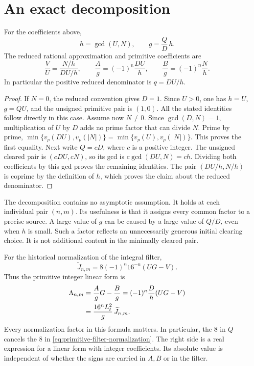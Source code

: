 \section{An exact decomposition}

\begin{proposition}
\label{prop:content-decomposition}
For the coefficients above,
\begin{equation}
 h=\gcd(U,N),\qquad
 g=\frac QD\,h.
 \label{eq:gcd-decomposition}
\end{equation}
The reduced rational approximation and primitive coefficients are
\begin{equation}
 \frac VU=\frac{N/h}{DU/h},\qquad
 \frac Ag=(-1)^n\frac{DU}{h},\qquad
 \frac Bg=(-1)^n\frac Nh.
 \label{eq:primitive-pair}
\end{equation}
In particular the positive reduced denominator is $q=DU/h$.
\end{proposition}

\begin{proof}
If $N=0$, the reduced convention gives $D=1$. Since $U>0$, one has $h=U$, $g=QU$, and the unsigned primitive pair is $(1,0)$. All the stated identities follow directly in this case. Assume now $N\ne0$. Since $\gcd(D,N)=1$, multiplication of $U$ by $D$ adds no prime factor that can divide $N$. Prime by prime, $\min\{v_p(DU),v_p(|N|)\}=\min\{v_p(U),v_p(|N|)\}$. This proves the first equality. Next write $Q=cD$, where $c$ is a positive integer. The unsigned cleared pair is $(cDU,cN)$, so its gcd is $c\gcd(DU,N)=ch$. Dividing both coefficients by this gcd proves the remaining identities. The pair $(DU/h,N/h)$ is coprime by the definition of $h$, which proves the claim about the reduced denominator.
\end{proof}

The decomposition contains no asymptotic assumption. It holds at each individual pair $(n,m)$. Its usefulness is that it assigns every common factor to a precise source. A large value of $g$ can be caused by a large value of $Q/D$, even when $h$ is small. Such a factor reflects an unnecessarily generous initial clearing choice. It is not additional content in the minimally cleared pair.

For the historical normalization of the integral filter,
\begin{equation}
 \widetilde J_{n,m}
 =8(-1)^n16^{-n}(UG-V).
 \label{eq:primitive-filter-normalization}
\end{equation}
Thus the primitive integer linear form is
\begin{align}
 \Lambda_{n,m}
 &=\frac AgG-\frac Bg
 =(-1)^n\frac D h(UG-V)\notag\\
 &=\frac{16^nL_\ell^2}{g}\,\widetilde J_{n,m}.
 \label{eq:primitive-error}
\end{align}
Every normalization factor in this formula matters. In particular, the $8$ in $Q$ cancels the $8$ in \eqref{eq:primitive-filter-normalization}. The right side is a real expression for a linear form with integer coefficients. Its absolute value is independent of whether the signs are carried in $A,B$ or in the filter.

